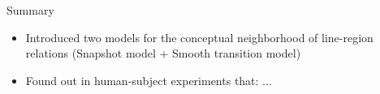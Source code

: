 
\begin{frame}{Summary}
	\begin{itemize}
		\item Introduced two models for the conceptual neighborhood of line-region relations (Snapshot model + Smooth transition model)
		
		\item Found out in human-subject experiments that: ...
	\end{itemize}
\end{frame}